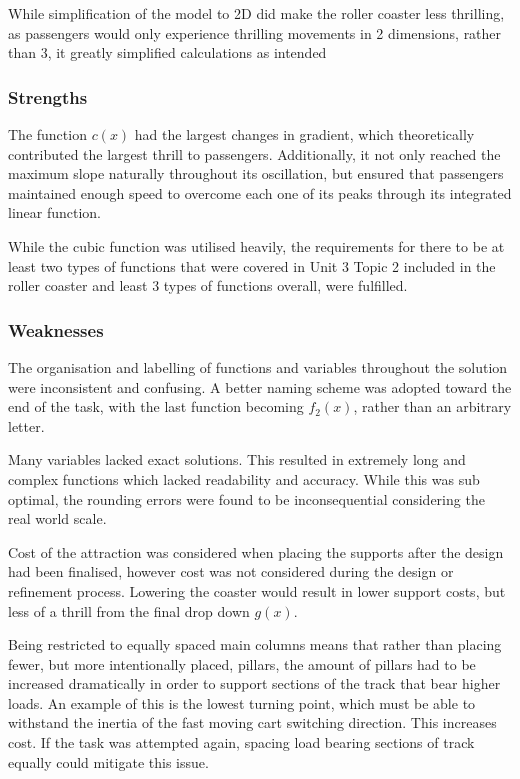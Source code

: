 \documentclass[11pt, letterpaper]{article}
\begin{document}
While simplification of the model to 2D did make the roller coaster less thrilling, as passengers would only experience thrilling movements in 2 dimensions, rather than 3, it greatly simplified calculations as intended


\subsubsection{Strengths}


The function $c(x)$ had the largest changes in gradient, which theoretically contributed the largest thrill to passengers. Additionally, it not only reached the maximum slope naturally throughout its oscillation, but ensured that passengers maintained enough speed to overcome each one of its peaks through its integrated linear function.

While the cubic function was utilised heavily, the requirements for there to be at least two types of functions that were covered in Unit 3 Topic 2 included in the roller coaster and least 3 types of functions overall, were fulfilled.



\subsubsection{Weaknesses}


The organisation and labelling of functions and variables throughout the solution were inconsistent and confusing. A better naming scheme was adopted toward the end of the task, with the last function becoming $f_2(x)$, rather than an arbitrary letter. 

Many variables lacked exact solutions. This resulted in extremely long and complex functions which lacked readability and accuracy. While this was sub optimal, the rounding errors were found to be inconsequential considering the real world scale.

Cost of the attraction was considered when placing the supports after the design had been finalised, however cost was not considered during the design or refinement process. Lowering the coaster would result in lower support costs, but less of a thrill from the final drop down $g(x)$.

Being restricted to equally spaced main columns means that rather than placing fewer, but more intentionally placed, pillars, the amount of pillars had to be increased dramatically in order to support sections of the track that bear higher loads. An example of this is the lowest turning point, which must be able to withstand the inertia of the fast moving cart switching direction. This increases cost. If the task was attempted again, spacing load bearing sections of track equally could mitigate this issue. 
\end{document}

